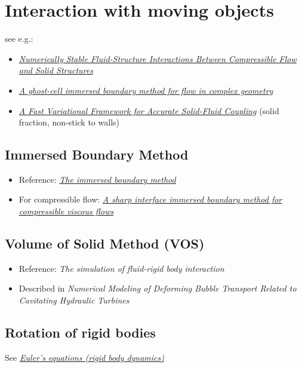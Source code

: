 \chapter{Interaction with moving objects}

see e.g.:

\begin{itemize}
    \item \textit{\href{http://physbam.stanford.edu/~fedkiw/papers/stanford2010-04.pdf}{Numerically Stable Fluid-Structure Interactions Between Compressible Flow and Solid Structures}}
    \item \textit{\href{http://efdl.as.ntu.edu.tw/research/papers/JCP03GCIBM.pdf}{A ghost-cell immersed boundary method for flow in complex geometry}}
    \item \textit{\href{http://www.cs.columbia.edu/~batty/papers/Batty07.pdf}{A Fast Variational Framework for Accurate Solid-Fluid Coupling}} (solid fraction, non-stick to walls)
\end{itemize}

\section{Immersed Boundary Method}

\begin{itemize}
    \item Reference: \textit{\href{http://www4.ncsu.edu/~zhilin/TEACHING/MA798Z/Peskin1.pdf}{The immersed boundary method}}
    \item For compressible flow: \textit{\href{http://www.cecs.wright.edu/~haibo.dong/wp-content/themes/publications/IBM_JCP_2007.pdf}{A sharp interface immersed boundary method for compressible viscous flows}}
\end{itemize}

\section{Volume of Solid Method (VOS)}

\begin{itemize}
    \item Reference: \textit{The simulation of fluid-rigid body interaction}
    \item Described in \textit{Numerical Modeling of Deforming Bubble Transport Related to Cavitating Hydraulic Turbines}
\end{itemize}

\section{Rotation of rigid bodies}

See \textit{\href{http://en.wikipedia.org/wiki/Euler\%27s_equations_\%28rigid_body_dynamics\%29}{Euler's equations (rigid body dynamics)}}